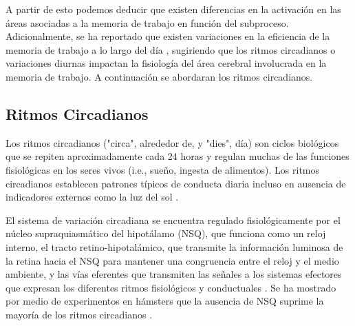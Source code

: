 \documentclass[12pt,letterpaper,final]{article}
\let\cite\cite %
\begin{document}


A partir de esto podemos deducir que existen diferencias en la activación en las áreas asociadas a la memoria de trabajo en función del subproceso. Adicionalmente, se ha reportado que existen variaciones en la eficiencia de la memoria de trabajo a lo largo del día \cite{Baddeley1970,Folkard1980,Folkard1983,Ramirez2006,Valdez2012,Valdez2014,Schmidt2015}, sugiriendo que los ritmos circadianos o variaciones diurnas impactan la fisiología del área cerebral involucrada en la memoria de trabajo. A continuación se abordaran los ritmos circadianos.

\subsection{Ritmos Circadianos}
Los ritmos circadianos ("circa", alrededor de, y "dies", día) son ciclos biológicos que se repiten aproximadamente cada 24 horas y regulan muchas de las funciones fisiológicas en los seres vivos (i.e., sueño, ingesta de alimentos). Los ritmos circadianos establecen patrones típicos de conducta diaria incluso en ausencia de indicadores externos como la luz del sol \cite{Carlson2014}.

El sistema de variación circadiana se encuentra regulado fisiológicamente por el núcleo supraquiasmático del hipotálamo (NSQ), que funciona como un reloj interno, el tracto retino-hipotalámico, que transmite la información luminosa de la retina hacia el NSQ para mantener una congruencia entre el reloj y el medio ambiente, y las vías eferentes que transmiten las señales a los sistemas efectores que expresan los diferentes ritmos fisiológicos y conductuales \cite{AngelesCastellanos2007}. Se ha mostrado por medio de experimentos en hámsters que la ausencia de NSQ suprime la mayoría de los ritmos circadianos \cite{Silver1996}.
\end{document}
